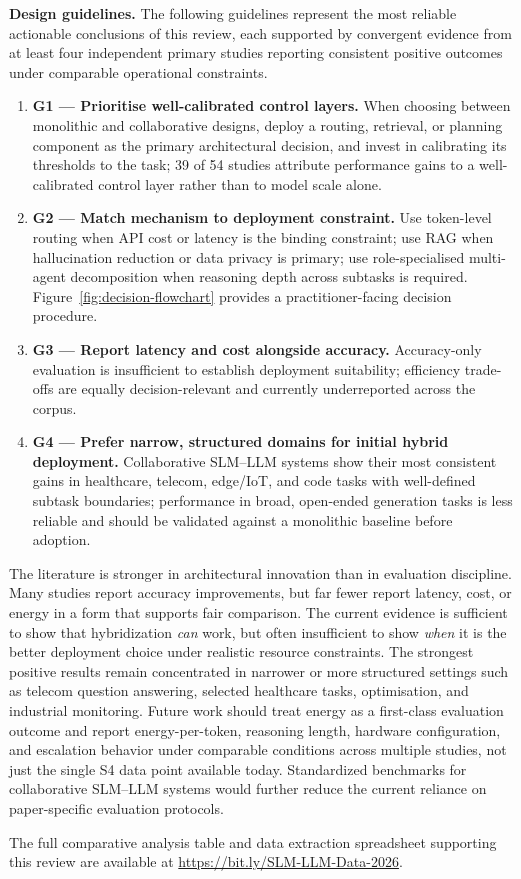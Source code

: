 \textbf{Design guidelines.} The following guidelines represent the most reliable actionable conclusions of this review, each supported by convergent evidence from at least four independent primary studies reporting consistent positive outcomes under comparable operational constraints.

\begin{enumerate}
    \item \textbf{G1 --- Prioritise well-calibrated control layers.} When choosing between monolithic and collaborative designs, deploy a routing, retrieval, or planning component as the primary architectural decision, and invest in calibrating its thresholds to the task; 39 of 54 studies attribute performance gains to a well-calibrated control layer rather than to model scale alone.
    \item \textbf{G2 --- Match mechanism to deployment constraint.} Use token-level routing when API cost or latency is the binding constraint; use RAG when hallucination reduction or data privacy is primary; use role-specialised multi-agent decomposition when reasoning depth across subtasks is required. Figure~\ref{fig:decision-flowchart} provides a practitioner-facing decision procedure.
    \item \textbf{G3 --- Report latency and cost alongside accuracy.} Accuracy-only evaluation is insufficient to establish deployment suitability; efficiency trade-offs are equally decision-relevant and currently underreported across the corpus.
    \item \textbf{G4 --- Prefer narrow, structured domains for initial hybrid deployment.} Collaborative SLM--LLM systems show their most consistent gains in healthcare, telecom, edge/IoT, and code tasks with well-defined subtask boundaries; performance in broad, open-ended generation tasks is less reliable and should be validated against a monolithic baseline before adoption.
\end{enumerate}

The literature is stronger in architectural innovation than in evaluation discipline. Many studies report accuracy improvements, but far fewer report latency, cost, or energy in a form that supports fair comparison. The current evidence is sufficient to show that hybridization \textit{can} work, but often insufficient to show \textit{when} it is the better deployment choice under realistic resource constraints. The strongest positive results remain concentrated in narrower or more structured settings such as telecom question answering, selected healthcare tasks, optimisation, and industrial monitoring. Future work should treat energy as a first-class evaluation outcome and report energy-per-token, reasoning length, hardware configuration, and escalation behavior under comparable conditions across multiple studies, not just the single S4 data point available today. Standardized benchmarks for collaborative SLM--LLM systems would further reduce the current reliance on paper-specific evaluation protocols.

The full comparative analysis table and data extraction spreadsheet supporting this review are available at \url{https://bit.ly/SLM-LLM-Data-2026}.
